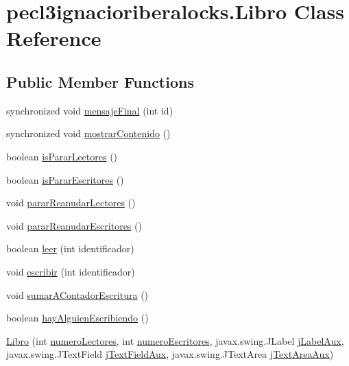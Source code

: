 \hypertarget{classpecl3ignacioriberalocks_1_1_libro}{}\section{pecl3ignacioriberalocks.\+Libro Class Reference}
\label{classpecl3ignacioriberalocks_1_1_libro}
\subsection*{Public Member Functions}
\begin{DoxyCompactItemize}
\item 
synchronized void \mbox{\hyperlink{classpecl3ignacioriberalocks_1_1_libro_a470c195ce7e3ee30af5090ddd7e685db}{mensaje\+Final}} (int id)
\item 
synchronized void \mbox{\hyperlink{classpecl3ignacioriberalocks_1_1_libro_aeb849a3a556d56c0b9e2fe166e9ac1a0}{mostrar\+Contenido}} ()
\item 
boolean \mbox{\hyperlink{classpecl3ignacioriberalocks_1_1_libro_ad610273d7ceed921e576e0c92ab083c1}{is\+Parar\+Lectores}} ()
\item 
boolean \mbox{\hyperlink{classpecl3ignacioriberalocks_1_1_libro_a23d9892b469564646e4e9aa19a88022d}{is\+Parar\+Escritores}} ()
\item 
void \mbox{\hyperlink{classpecl3ignacioriberalocks_1_1_libro_a400ffab628cf38370362f1c7fec24c47}{parar\+Reanudar\+Lectores}} ()
\item 
void \mbox{\hyperlink{classpecl3ignacioriberalocks_1_1_libro_a8f8b0a5509bb76c609107a64826bfc1f}{parar\+Reanudar\+Escritores}} ()
\item 
boolean \mbox{\hyperlink{classpecl3ignacioriberalocks_1_1_libro_ad4034cbd0be40ee9ed94da0bc98c0c66}{leer}} (int identificador)
\item 
void \mbox{\hyperlink{classpecl3ignacioriberalocks_1_1_libro_ab122d519b84415808a92fd4582cc47d3}{escribir}} (int identificador)
\item 
void \mbox{\hyperlink{classpecl3ignacioriberalocks_1_1_libro_acc729cd669b5113fd1ec2a529fd24257}{sumar\+A\+Contador\+Escritura}} ()
\item 
boolean \mbox{\hyperlink{classpecl3ignacioriberalocks_1_1_libro_a17bd8e545ed8011dca2116ff116ff5b8}{hay\+Alguien\+Escribiendo}} ()
\item 
\mbox{\hyperlink{classpecl3ignacioriberalocks_1_1_libro_a7ce0e58867b29af5aaf169c04e86f0c4}{Libro}} (int \mbox{\hyperlink{classpecl3ignacioriberalocks_1_1_libro_a7c53211c6562aff8e31edf3e76882bc7}{numero\+Lectores}}, int \mbox{\hyperlink{classpecl3ignacioriberalocks_1_1_libro_a3ce4bcaf93bab9853ac3a450ed709626}{numero\+Escritores}}, javax.\+swing.\+J\+Label \mbox{\hyperlink{classpecl3ignacioriberalocks_1_1_libro_a36ec328acc3a2636adeb3d93b67c5184}{j\+Label\+Aux}}, javax.\+swing.\+J\+Text\+Field \mbox{\hyperlink{classpecl3ignacioriberalocks_1_1_libro_aa7207f75bf58afbf14b600038be4bc5f}{j\+Text\+Field\+Aux}}, javax.\+swing.\+J\+Text\+Area \mbox{\hyperlink{classpecl3ignacioriberalocks_1_1_libro_a16681c45336d0e06fcddcbff96b7bd5d}{j\+Text\+Area\+Aux}})
\end{DoxyCompactItemize}
